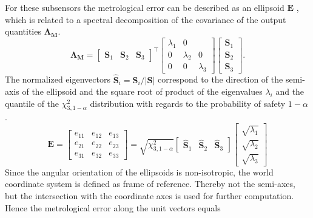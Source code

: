 \documentclass[5p,times,procedia]{elsarticle}
\begin{document}
%
For these subsensors the metrological error can be described as an ellipsoid $\mathbf{E}$ \cite{Luhmann2003}, which is related to a spectral decomposition of the covariance of the output quantities $\mathbf{\Lambda_{M}}$.
%
\begin{equation}
	\mathbf{\Lambda_{M}} =
	\begin{bmatrix}
		\mathbf{S}_1^{} & \mathbf{S}_2^{} & \mathbf{S}_3^{}
	\end{bmatrix}^{\top}
	\begin{bmatrix}
		\lambda_1^{} & 0 \\
		0 & \lambda_2^{} &  0 \\
		0 & 0 &  \lambda_3^{}
	\end{bmatrix}
	\begin{bmatrix}
		\mathbf{S}_1^{} \\
		\mathbf{S}_2^{} \\
		\mathbf{S}_3^{}
	\end{bmatrix}.
\end{equation}
%
The normalized eigenvectors $\mathbf{\hat{S}}_i = \mathbf{S}_i / |\mathbf{S}|$ correspond to the direction of the semi-axis of the ellipsoid and the square root of product of the eigenvalues $\lambda_i$ and the quantile of the $\chi^2_{3,1-\alpha} $ distribution with regards to the probability of safety $1-\alpha$ \cite{Pelzer1995}.
%
\begin{equation}
	\mathbf{E} =
	\begin{bmatrix}
		e_{11}^{} & e_{12}^{} & e_{13}^{} \\
		e_{21}^{} & e_{22}^{} & e_{23}^{} \\
		e_{31}^{} & e_{32}^{} & e_{33}^{}
	\end{bmatrix}
	=
	\sqrt{ \chi^2_{3,1-\alpha}}
	\begin{bmatrix}
		\mathbf{\hat{S}}_1^{} & \mathbf{\hat{S}}_2^{} & \mathbf{\hat{S}}_3^{}
	\end{bmatrix}
	\begin{bmatrix}
		\sqrt{\lambda_1^{}} \\
		\sqrt{\lambda_2^{}} \\
		\sqrt{\lambda_3^{}}
	\end{bmatrix}
\end{equation}
Since the angular orientation of the ellipsoids is non-isotropic, the world coordinate system
is defined as frame of reference. Thereby not the semi-axes, but the intersection with the coordinate
axes is used for further computation. Hence the metrological error along the unit vectors equals
\end{document}
